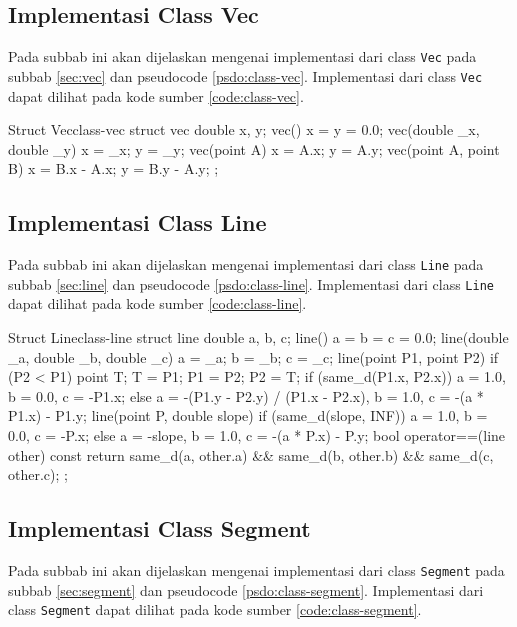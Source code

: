 \subsection{ Implementasi Class Vec}
Pada subbab ini akan dijelaskan mengenai implementasi dari class \texttt{Vec} pada subbab \ref{sec:vec} dan pseudocode \ref{psdo:class-vec}. Implementasi dari class \texttt{Vec} dapat dilihat pada kode sumber \ref{code:class-vec}.

\newpage
\begin{code}[firstnumber=1]{Struct Vec}{class-vec}
struct vec{
	double x, y;
	vec(){
		x = y = 0.0;
	}
	vec(double _x, double _y){
		x = _x;
		y = _y;
	}
	vec(point A){
		x = A.x;
		y = A.y;
	}
	vec(point A, point B){
		x = B.x - A.x;
		y = B.y - A.y;
	}
};
\end{code}

\subsection{ Implementasi Class Line}
Pada subbab ini akan dijelaskan mengenai implementasi dari class \texttt{Line} pada subbab \ref{sec:line} dan pseudocode \ref{psdo:class-line}. Implementasi dari class \texttt{Line} dapat dilihat pada kode sumber \ref{code:class-line}.

\newpage
\begin{code}[firstnumber=1]{Struct Line}{class-line}
struct line{
	double a, b, c;
	line(){
		a = b = c = 0.0;
	}
	line(double _a, double _b, double _c){
		a = _a;
		b = _b;
		c = _c;
	}
	line(point P1, point P2){
		if (P2 < P1){
			point T;
			T = P1;
			P1 = P2;
			P2 = T;
		}
		if (same_d(P1.x, P2.x))
			a = 1.0, b = 0.0, c = -P1.x;
		else
			a = -(P1.y - P2.y) / (P1.x - P2.x), b = 1.0, c = -(a * P1.x) - P1.y;
	}
	line(point P, double slope){
		if (same_d(slope, INF))
			a = 1.0, b = 0.0, c = -P.x;
		else
			a = -slope, b = 1.0, c = -(a * P.x) - P.y;
	}
	bool operator==(line other) const{
		return same_d(a, other.a) && same_d(b, other.b) && same_d(c, other.c);
	}
};
\end{code}

\subsection{ Implementasi Class Segment}
Pada subbab ini akan dijelaskan mengenai implementasi dari class \texttt{Segment} pada subbab \ref{sec:segment} dan pseudocode \ref{psdo:class-segment}. Implementasi dari class \texttt{Segment} dapat dilihat pada kode sumber \ref{code:class-segment}.

